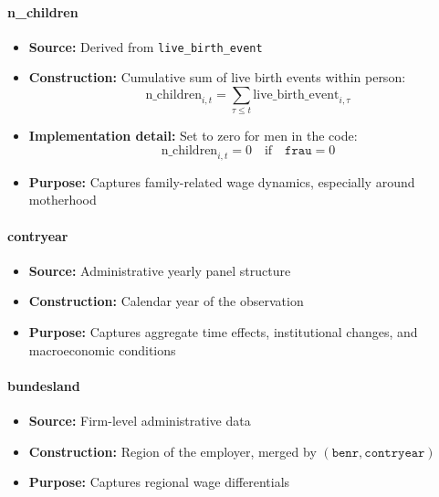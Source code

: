 \documentclass{article}
\begin{document}
\paragraph{n\_children}
\begin{itemize}
    \item \textbf{Source:} Derived from \texttt{live\_birth\_event}
    \item \textbf{Construction:} Cumulative sum of live birth events within person:
    \begin{equation}
        \text{n\_children}_{i,t} = \sum_{\tau \leq t} \text{live\_birth\_event}_{i,\tau}
    \end{equation}
    \item \textbf{Implementation detail:} Set to zero for men in the code:
    \begin{equation}
        \text{n\_children}_{i,t} = 0 \quad \text{if} \quad \texttt{frau}=0
    \end{equation}
    \item \textbf{Purpose:} Captures family-related wage dynamics, especially around motherhood
\end{itemize}

\paragraph{contryear}
\begin{itemize}
    \item \textbf{Source:} Administrative yearly panel structure
    \item \textbf{Construction:} Calendar year of the observation
    \item \textbf{Purpose:} Captures aggregate time effects, institutional changes, and macroeconomic conditions
\end{itemize}

\paragraph{bundesland}
\begin{itemize}
    \item \textbf{Source:} Firm-level administrative data
    \item \textbf{Construction:} Region of the employer, merged by $(\texttt{benr}, \texttt{contryear})$
    \item \textbf{Purpose:} Captures regional wage differentials
\end{itemize}
\end{document}
